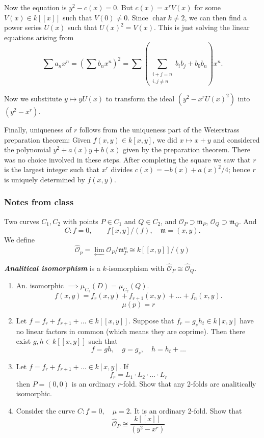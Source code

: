 \begin{enumerate}[label=(\alph*)]
	Now the equation is $y^2 - c(x) = 0$.
	But $c(x) = x^r V(x)$ for some $V(x) \in k[[x]]$ such that $V(0) \ne 0$.
	Since $\operatorname{char} k \ne 2$, we can then find a power series $U(x)$ such that $U(x)^2 = V(x)$. This is just solving the linear equations arising from
	\[ \sum a_nx^n = \left( \sum b_n x^n \right)^2 = \sum ( \sum_{\substack{i+j=n\\ i,j \ne n}} b_i b_j + b_0b_n ) x^n. \]
	
	Now we substitute $y \mapsto yU(x)$ to transform the ideal $(y^2 - x^rU(x)^2)$ into $(y^2 - x^r)$.
	
	Finally, uniqueness of $r$ follows from the uniqueness part of the Weierstrass preparation theorem:
	Given $f(x,y) \in k[x,y]$, we did $x \mapsto x + y$ and considered the polynomial $y^2 + a(x)y + b(x)$ given by the preparation theorem. There was no choice involved in these steps.
	After completing the square we saw that $r$ is the largest integer such that $x^r$ divides $c(x) = -b(x) + a(x)^2/4$; hence $r$ is uniquely determined by $f(x,y)$.
\end{enumerate}



\subsubsection{Notes from class}

Two curves $C_1,C_2$ with points $P \in C_1$ and $Q\in C_2$, and $\mathcal{O}_P\supset\mathfrak{m}_P$, $\mathcal{O}_Q\supset\mathfrak{m}_Q$. And
\[C:f=0,\qquad f[x,y]/(f), \quad \mathfrak{m}=(x,y).\]
We define
\[\hat{\mathcal{O}}_p=\lim_{\longleftarrow} \mathcal{O}_P/\mathfrak{m}^n_P\cong k[ [x,y]]/(y)\]

\begin{defn}
	\textit{\textbf{Analitical isomorphism}} is a $k$-isomorphism with $\hat{\mathcal{O}}_P\cong \hat{\mathcal{O}}_Q$.
\end{defn}

\begin{manualexercise}{}
	\begin{enumerate}[label=\alph*.]
		\item An. isomorphic $\implies \mu_{C_1}(D)=\mu_{C_2}(Q)$.
\[f(x,y)=f_r(x,y)+f_{r+1}(x,y)+\ldots+f_n(x,y).\]
\[\mu(p)=r\]

\item Let $f=f_r+f_{r+1}+\ldots\in k[[x,y]]$. Suppose that $f_r=g_s h_t\in k[x,y]$ have no linear factors in common (which means they are coprime). Then there exist $g,h\in k[ [ x,y] ]$ such that
	\[f=gh,\quad g=g_s,\quad h=h_t+\ldots\]

	\item Let $f=f_r+f_{r+1}+\ldots\in k[x,y]$. If
		\[f_r=L_1\cdot L_2\cdot \ldots\cdot L_r\]
		then $P=(0,0)$ is an ordinary $r$-fold. Show that any 2-folds are analitically isomorphic.

		\item Consider the curve $C:f=0,\quad \mu=2$. It is an ordinary 2-fold. Show that
			\[\hat{\mathcal{O}}_P\cong \frac{k[ [ x] ]}{(y^2-x^r)}\]
	\end{enumerate}
\end{manualexercise}

